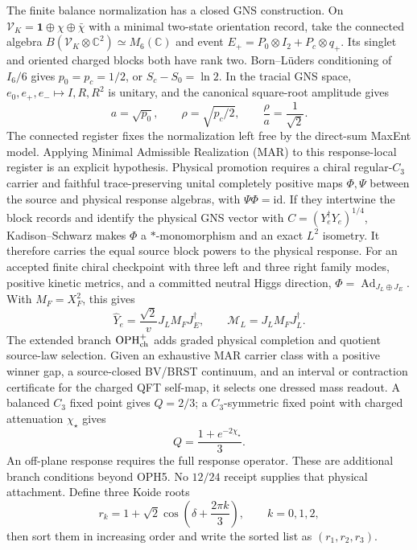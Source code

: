 \documentclass[11pt]{article}
\theoremstyle{remark}
\begin{document}
The finite balance normalization has a closed GNS construction. On
\(\mathcal V_K=\mathbf1\oplus\chi\oplus\bar\chi\) with a minimal two-state
orientation record, take the connected algebra
\(B(\mathcal V_K\otimes\mathbb C^2)\simeq M_6(\mathbb C)\) and event
\(E_+=P_0\otimes I_2+P_c\otimes q_+\). Its singlet and oriented charged blocks
both have rank two. Born--L\"uders conditioning of \(I_6/6\) gives
\(p_0=p_c=1/2\), or \(S_c-S_0=\ln2\). In the tracial GNS space,
\(e_0,e_+,e_-\mapsto I,R,R^2\) is unitary, and the canonical square-root
amplitude gives
\[
 a=\sqrt{p_0},\qquad \rho=\sqrt{p_c/2},\qquad
 \frac{\rho}{a}=\frac1{\sqrt2}.
\]
The connected register fixes the normalization left free by the direct-sum
MaxEnt model. Applying Minimal Admissible Realization (MAR) to this
response-local register is an explicit hypothesis. Physical promotion requires
a chiral regular-\(C_3\) carrier and faithful trace-preserving unital
completely positive maps \(\Phi,\Psi\) between the source and physical
response algebras, with \(\Psi\Phi=\mathrm{id}\). If they intertwine the
block records and identify the physical GNS vector with
\(C=(Y_e^\dagger Y_e)^{1/4}\), Kadison--Schwarz makes \(\Phi\) a
\(*\)-monomorphism and an exact \(L^2\) isometry. It therefore carries the
equal source block powers to the physical response. For an accepted finite
chiral checkpoint with three left and three right family modes, positive
kinetic metrics, and a committed neutral Higgs direction,
\(\Phi=\operatorname{Ad}_{J_L\oplus J_E}\). With \(M_F=X_F^2\), this gives
\[
\widehat Y_e=\frac{\sqrt2}{v}J_LM_FJ_E^\dagger,
\qquad
\mathcal M_L=J_LM_FJ_L^\dagger.
\]
The extended branch \(\mathrm{OPH}^{+}_{\rm ch}\) adds graded physical
completion and quotient source-law selection. Given an exhaustive MAR carrier
class with a positive winner gap, a source-closed BV/BRST continuum, and an
interval or contraction certificate for the charged QFT self-map, it selects
one dressed mass readout. A balanced \(C_3\) fixed point gives \(Q=2/3\); a
\(C_3\)-symmetric fixed point with charged attenuation \(\chi_\star\) gives
\[
Q=\frac{1+e^{-2\chi_\star}}{3}.
\]
An off-plane response requires the full response operator. These are
additional branch conditions beyond OPH5. No \(12/24\) receipt supplies that
physical attachment.
Define three Koide roots
\begin{equation}
r_k=1+\sqrt2\cos\!\left(\delta+\frac{2\pi k}{3}\right),
\qquad k=0,1,2,
\label{eq:koide}
\end{equation}
then sort them in increasing order and write the sorted list as
\((r_1,r_2,r_3)\).
\end{document}
